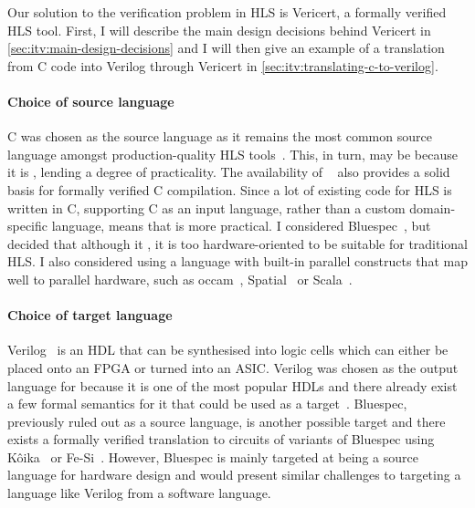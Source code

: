 Our solution to the verification problem in \gls{HLS} is Vericert, a formally
verified \gls{HLS} tool.  First, I will describe the main design decisions
behind Vericert in \cref{sec:itv:main-design-decisions} and I will then give an
example of a translation from C code into Verilog through Vericert in
\cref{sec:itv:translating-c-to-verilog}.

\paragraph{Choice of source language}

C was chosen as the source language as it remains the most common source
language amongst production-quality HLS tools~\cite{canis13_l,
  amd23_vitis_high_synth, intel20_hsc, pilato13_bambu}. This, in turn, may be
because it is , lending a
degree of practicality.  The availability of
\compcert{}~\cite{leroy09_formal_verif_realis_compil} also provides a solid
basis for formally verified C compilation.  Since a lot of existing code for HLS
is written in C, supporting C as an input language, rather than a custom
domain-specific language, means that \vericert{} is more practical.  I
considered Bluespec~\cite{nikhil04_bsv}, but decided that although it
, it is too hardware-oriented to be suitable for traditional HLS.  I
also considered using a language with built-in parallel constructs that map well
to parallel hardware, such as occam~\cite{page91_compil_occam},
Spatial~\cite{koeplinger18_s} or Scala~\cite{bachrach12_chisel}.

\paragraph{Choice of target language}

Verilog~\cite{06_ieee_stand_veril_hardw_descr_languag} is an \gls{HDL} that can
be synthesised into logic cells which can either be placed onto an \gls{FPGA} or
turned into an \gls{ASIC}.  Verilog was chosen as the output language for
\vericert{} because it is one of the most popular HDLs and there already exist a
few formal semantics for it that could be used as a
target~\cite{lööw19_verif_compil_verif_proces, meredith10_veril}.  Bluespec,
previously ruled out as a source language, is another possible target and there
exists a formally verified translation to circuits of variants of Bluespec using
K\^{o}ika~\cite{bourgeat20_essen_blues} or
Fe-Si~\cite{braibant13_formal_verif_hardw_synth}.  However, Bluespec is mainly
targeted at being a source language for hardware design and would present
similar challenges to targeting a language like Verilog from a software
language.

